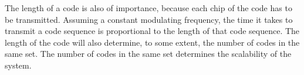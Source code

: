 The length of a code is also of importance, because each chip of the code has to be transmitted.
Assuming a constant modulating frequency, the time it takes to transmit a code sequence is proportional to the length of that code sequence.
The length of the code will also determine, to some extent, the number of codes in the same set.
The number of codes in the same set determines the scalability of the system.




